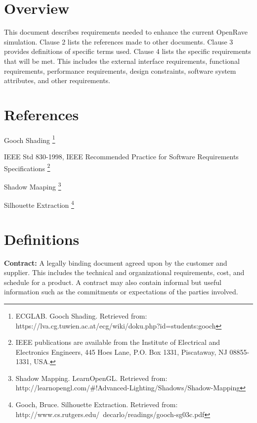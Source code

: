 \documentclass[10pt,journal,compsoc]{IEEEtran}
\begin{document}
\newpage

\tableofcontents

\newpage
\begin{flushleft}
\section{Overview}
\vspace{3mm}
This document describes requirements needed to enhance the current OpenRave simulation. 
Clause 2 lists the references made to other documents. 
Clause 3 provides definitions of specific terms used.
Clause 4 lists the specific requirements that will be met.
This includes the external interface requirements, functional requirements, performance requirements, design constraints, software system attributes, and other requirements.

\section{References}
\vspace{3mm}

Gooch Shading \footnote{\label{note1}ECGLAB. Gooch Shading. Retrieved from: https://lva.cg.tuwien.ac.at/ecg/wiki/doku.php?id=students:gooch}
\vspace{3mm}

IEEE Std 830-1998, IEEE Recommended Practice for Software Requirements Specifications \footnote{\label{note2}IEEE publications are available from the Institute of Electrical and Electronics Engineers, 445 Hoes Lane, P.O. Box 1331, Piscataway, NJ 08855-1331, USA.}
\vspace{3mm}

Shadow Maaping \footnote{\label{note3} Shadow Mapping. LearnOpenGL. Retrieved from: http://learnopengl.com/\#!Advanced-Lighting/Shadows/Shadow-Mapping}
\vspace{3mm}

Silhouette Extraction \footnote{\label{note4}Gooch, Bruce. Silhouette Extraction. Retrieved from: http://www.cs.rutgers.edu/~decarlo/readings/gooch-sg03c.pdf}

\section{Definitions}

\vspace{3mm}
\textbf{Contract:}
A legally binding document agreed upon by the customer and supplier. This includes the technical and organizational requirements, cost, and schedule for a product. A contract may also contain informal but useful information such as the commitments or expectations of the parties involved.


\end{flushleft}
\end{document}
